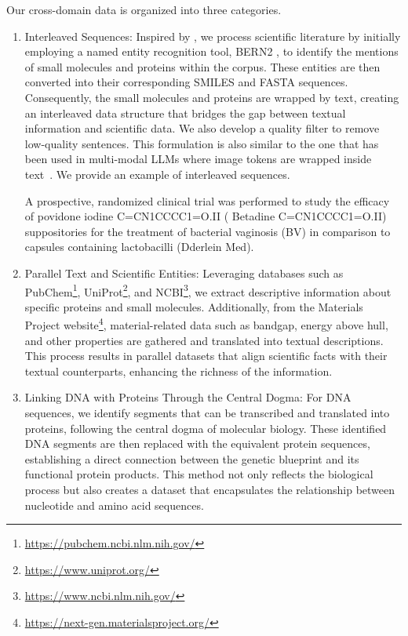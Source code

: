 Our cross-domain data is organized into three categories.
\begin{enumerate}
    \item Interleaved Sequences: Inspired by \cite{liu2023molxpt}, we process scientific literature by initially employing a named entity recognition tool, BERN2 \cite{bern2}, to identify the mentions of small molecules and proteins within the corpus. These entities are then converted into their corresponding SMILES and FASTA sequences.
    Consequently, the small molecules and proteins are wrapped by text, creating an interleaved data structure that bridges the gap between textual information and scientific data. We also develop a quality filter to remove low-quality sentences.
    This formulation is also similar to the one that has been used in multi-modal LLMs where image tokens are wrapped inside text~\cite{Zhu2023MultimodalCA,Zhan2024AnyGPTUM,team2024chameleon}. We provide an example of interleaved sequences.
    \begin{example}
        A prospective, randomized clinical trial was performed to study the efficacy of povidone iodine \mol{}C=CN1CCCC1=O.II\emol{} ( Betadine \mol{}C=CN1CCCC1=O.II\emol{}) suppositories for the treatment of bacterial vaginosis (BV) in comparison to capsules containing lactobacilli (Dderlein Med).
    \end{example}
    \item Parallel Text and Scientific Entities: Leveraging databases such as PubChem\footnote{\url{https://pubchem.ncbi.nlm.nih.gov/}}, UniProt\footnote{\url{https://www.uniprot.org/}}, and NCBI\footnote{\url{https://www.ncbi.nlm.nih.gov/}}, we extract descriptive information about specific proteins and small molecules. Additionally, from the Materials Project website\footnote{\url{https://next-gen.materialsproject.org/}}, material-related data such as bandgap, energy above hull, and other properties are gathered and translated into textual descriptions. This process results in parallel datasets that align scientific facts with their textual counterparts, enhancing the richness of the information. 
    \item Linking DNA with Proteins Through the Central Dogma: For DNA sequences, we identify segments that can be transcribed and translated into proteins, following the central dogma of molecular biology. These identified DNA segments are then replaced with the equivalent protein sequences, establishing a direct connection between the genetic blueprint and its functional protein products. This method not only reflects the biological process but also creates a dataset that encapsulates the relationship between nucleotide and amino acid sequences.
\end{enumerate}


